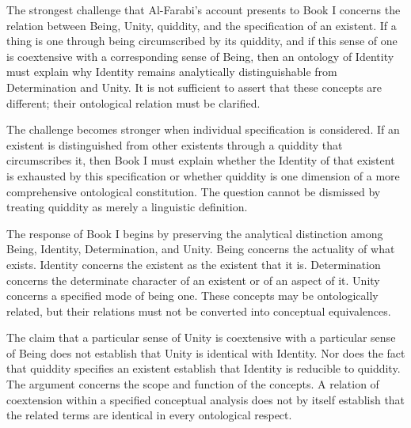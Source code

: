 The strongest challenge that
Al-Farabi's account presents
to Book I concerns the
relation between Being,
Unity, quiddity, and the
specification of an existent.
If a thing is one through
being circumscribed by its
quiddity, and if this sense
of one is coextensive with
a corresponding sense
of Being, then an ontology
of Identity must explain
why Identity remains
analytically distinguishable
from Determination and
Unity. It is not sufficient
to assert that these concepts
are different; their
ontological relation must
be clarified.
\citep[sec.~3.6]{MennAlFarabiMetaphysicsSEP2026}

\label{para:VS.B01.P01.C08.S12.SS14.P002}

The challenge becomes stronger
when individual specification
is considered. If an existent
is distinguished from other
existents through a quiddity
that circumscribes it, then
Book I must explain whether
the Identity of that existent
is exhausted by this
specification or whether
quiddity is one dimension
of a more comprehensive
ontological constitution.
The question cannot be
dismissed by treating
quiddity as merely a
linguistic definition.

\label{para:VS.B01.P01.C08.S12.SS14.P003}

The response of Book I begins
by preserving the analytical
distinction among Being,
Identity, Determination,
and Unity. Being concerns
the actuality of what exists.
Identity concerns the
existent as the existent
that it is. Determination
concerns the determinate
character of an existent
or of an aspect of it.
Unity concerns a specified
mode of being one. These
concepts may be ontologically
related, but their relations
must not be converted into
conceptual equivalences.

\label{para:VS.B01.P01.C08.S12.SS14.P004}

The claim that a particular
sense of Unity is coextensive
with a particular sense
of Being does not establish
that Unity is identical
with Identity. Nor does
the fact that quiddity
specifies an existent
establish that Identity
is reducible to quiddity.
The argument concerns
the scope and function
of the concepts. A relation
of coextension within
a specified conceptual
analysis does not by itself
establish that the related
terms are identical in
every ontological respect.

\label{para:VS.B01.P01.C08.S12.SS14.P005}

